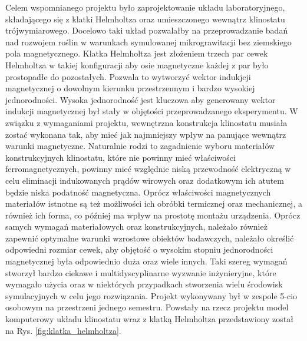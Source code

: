 Celem wspomnianego projektu było zaprojektowanie układu laboratoryjnego, składającego się z
 klatki Helmholtza oraz umieszczonego wewnątrz klinostatu trójwymiarowego. Docelowo taki układ
  pozwalałby na przeprowadzanie badań nad rozwojem roślin w warunkach symulowanej
   mikrograwitacji bez ziemskiego pola magnetycznego. Klatka Helmholtza jest złożeniem trzech
    par cewek Helmholtza w takiej konfiguracji aby osie magnetyczne każdej z par było
     prostopadłe do pozostałych. Pozwala to wytworzyć wektor indukjcji magnetycznej o dowolnym
      kierunku przestrzennym i bardzo wysokiej jednorodności. Wysoka jednorodność jest kluczowa
       aby generowany wektor indukcji magnetycznej był stały w objętości przeprowadzanego
        eksperymentu. W związku z wymaganiami projektu, wewnętrzna konstrukcja klinostatu
         musiała zostać wykonana tak, aby mieć jak najmniejszy wpływ na panujące wewnątrz
          warunki magnetyczne. Naturalnie rodzi to zagadnienie wyboru materiałów konstrukcyjnych
           klinostatu, które nie powinny mieć właściwości ferromagnetycznych, powinny mieć
            względnie niską przewodność elektryczną w celu eliminacji indukowanych prądów
             wirowych oraz dodatkowym ich atutem będzie niska podatność magnetyczna. Oprócz
              właściwości magnetycznych materiałów istnotne są też możliwości ich obróbki
               termicznej oraz mechanicznej, a również ich forma, co później ma wpływ na
                prostotę montażu urządzenia. Oprócz samych wymagań materiałowych oraz
                 konstrukcyjnych, należało również zapewnić optymalne warunki wzrostowe obiektów
                  badawczych, należało określić odpowiedni rozmiar cewek, aby objętość o wysokim
                   stopniu jednorodności magnetycznej była odpowiednio duża oraz wiele innych.
                    Taki szereg wymagań stworzył bardzo ciekawe i multidyscyplinarne wyzwanie
                     inżynieryjne, które wymagało użycia oraz w niektórych przypadkach
                      stworzenia wielu środowisk symulacyjnych w celu jego rozwiązania. Projekt
                       wykonywany był w zespole 5-cio osobowym na przestrzeni jednego semestru.
                        Powstały na rzecz projektu model komputerowy układu klinostatu wraz z
                         klatką Helmholtza przedstawiony został na Rys.
                          \ref{fig:klatka_helmholtza}.
                          

